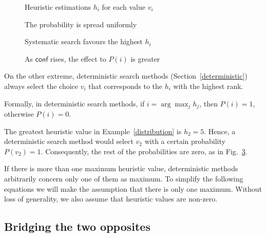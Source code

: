 \documentclass{ws-ijait}
\begin{document}
\begin{figure}
  \centering
  
  \caption{Heuristic estimations $h_i$ for each value
           $v_i$\label{heuristics}}
\end{figure}

\begin{figure}
  \centering
  
  \caption{The probability is spread
           uniformly\label{uniform}}
\end{figure}

\begin{figure}
  \centering
  
  \caption{Systematic search favours the highest
           $h_i$\label{systematic}}
\end{figure}

\begin{figure}
  \centering
  
  \caption{As $\mathsf{conf}$ rises, the effect to $P(i)$ is
           greater\label{conf}}
\end{figure}

On the other extreme, deterministic search methods
(Section~\ref{deterministic}) always select the choice $v_i$
that corresponds to the $h_i$ with the highest rank.
\begin{proposition}
  \label{probability-deterministic}
  Formally, in deterministic search methods, if $i =
  \arg\max_j h_j$, then $P(i) = 1$, otherwise $P(i) = 0$.
\end{proposition}
\begin{example}
  The greatest heuristic value in Example~\ref{distribution}
  is $h_2 = 5$. Hence, a deterministic search method would
  select $v_2$ with a certain probability $P(v_2) = 1$.
  Consequently, the rest of the probabilities are zero, as
  in Fig.~\ref{systematic}.
\end{example}
If there is more than one maximum heuristic value,
deterministic methods arbitrarily concern only one of them
as maximum. To simplify the following equations we will make
the assumption that there is only one maximum. Without loss
of generality, we also assume that heuristic values are
non-zero.

\subsection{Bridging the two opposites}
\end{document}
